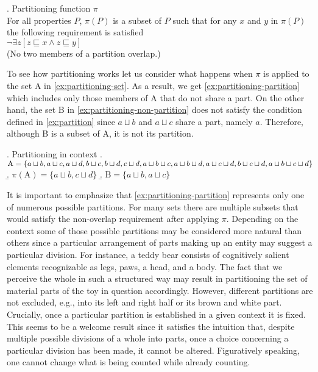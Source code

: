 	\ex. Partitioning function $\pi$\\
	For all properties $P$, $\pi(P)$ is a subset of $P$ such that for any $x$ and $y$ in $\pi(P)$ the following requirement is satisfied\\
	$\neg \exists z[z \sqsubseteq x \wedge z \sqsubseteq y]$\\
	(No two members of a partition overlap.)\label{ex:partition}

	To see how partitioning works let us consider what happens when $\pi$ is applied to the set A in \ref{ex:partitioning-set}. As a result, we get \ref{ex:partitioning-partition} which includes only those members of A that do not share a part. On the other hand, the set B in \ref{ex:partitioning-non-partition} does not satisfy the condition defined in \ref{ex:partition} since $a\sqcup b$ and $a\sqcup c$ share a part, namely $a$. Therefore, although B is a subset of A, it is not its partition.\largerpage
	
	\ex. Partitioning in context\label{ex:partitioning}
	\a. $\text{A} = \{a \sqcup b, a \sqcup c, a \sqcup d, b \sqcup c, b \sqcup d, c \sqcup d, a \sqcup b \sqcup c, a \sqcup b \sqcup d, a \sqcup c \sqcup d, \\ b \sqcup c \sqcup d, a \sqcup b \sqcup c \sqcup d\}$\label{ex:partitioning-set}
	\b. $\pi(\text{A}) = \{a\sqcup b, c\sqcup d\}$\label{ex:partitioning-partition}
	\b. $\text{B} = \{a\sqcup b, a\sqcup c\}$\label{ex:partitioning-non-partition}
	
	It is important to emphasize that \ref{ex:partitioning-partition} represents only one of numerous possible partitions. For many sets there are multiple subsets that would satisfy the non-overlap requirement after applying $\pi$. Depending on the context some of those possible partitions may be considered more natural than others since a particular arrangement of parts making up an entity may suggest a particular division. For instance, a teddy bear consists of cognitively salient elements recognizable as legs, paws, a head, and a body. The fact that we perceive the whole in such a structured way may result in partitioning the set of material parts of the toy in question accordingly.  However, different partitions are not excluded, e.g., into its left and right half or its brown and white part. Crucially, once a particular partition is established in a given context it is fixed. This seems to be a welcome result since it satisfies the intuition that, despite multiple possible divisions of a whole into parts, once a choice concerning a particular division has been made, it cannot be altered. Figuratively speaking, one cannot change what is being counted while already counting.
	
